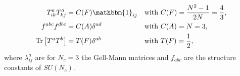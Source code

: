 \begin{align}
T^a_{ik} T^a_{kj} &= C(F)\mathbbm{1}_{ij} && \mbox{with}\ C(F) = \frac{N^2-1}{2N} = \frac{4}{3},\nonumber\\
f^{abc} f^{dbc} &= C(A)\delta^{ad} && \mbox{with}\ C(A) = N = 3,\nonumber\\
\mathrm{Tr}\left[T^aT^b\right] &= T(F)\delta^{ab} && \mbox{with}\ T(F) = \frac{1}{2},\label{eq:DynkinIndex}
\end{align}
where $\lambda^a_{ij}$ are for $N_c = 3$ the Gell-Mann matrices and $f_{abc}$ are the structure constants of $SU(N_c)$.



